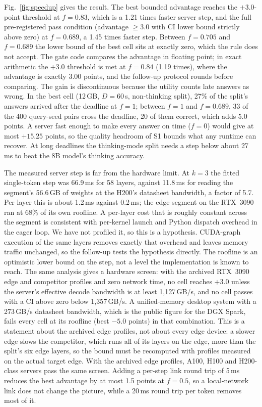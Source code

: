 \documentclass[lettersize,journal]{IEEEtran}
\begin{document}
Fig.~\ref{fig:speedup} gives the result. The best bounded advantage reaches the $+3.0$-point threshold at $f=0.83$, which is a 1.21 times faster server step, and the full pre-registered pass condition (advantage $\geq3.0$ with CI lower bound strictly above zero) at $f=0.689$, a 1.45 times faster step. Between $f=0.705$ and $f=0.689$ the lower bound of the best cell sits at exactly zero, which the rule does not accept. The gate code compares the advantage in floating point; in exact arithmetic the $+3.0$ threshold is met at $f=0.84$ (1.19 times), where the advantage is exactly 3.00 points, and the follow-up protocol rounds before comparing. The gain is discontinuous because the utility counts late answers as wrong. In the best cell (12\,GB, $D=60$\,s, non-thinking split), 27\% of the split's answers arrived after the deadline at $f=1$; between $f=1$ and $f=0.689$, 33 of the 400 query-seed pairs cross the deadline, 20 of them correct, which adds 5.0 points. A server fast enough to make every answer on time ($f=0$) would give at most $+15.25$ points, so the quality headroom of S1 bounds what any runtime can recover. At long deadlines the thinking-mode split needs a step below about 27\,ms to beat the 8B model's thinking accuracy.

The measured server step is far from the hardware limit. At $k=3$ the fitted single-token step was 66.9\,ms for 58 layers, against 11.8\,ms for reading the segment's 56.6\,GB of weights at the H200's datasheet bandwidth, a factor of 5.7. Per layer this is about 1.2\,ms against 0.2\,ms; the edge segment on the RTX~3090 ran at 68\% of its own roofline. A per-layer cost that is roughly constant across the segment is consistent with per-kernel launch and Python dispatch overhead in the eager loop. We have not profiled it, so this is a hypothesis. CUDA-graph execution of the same layers removes exactly that overhead and leaves memory traffic unchanged, so the follow-up tests the hypothesis directly. The roofline is an optimistic lower bound on the step, not a level the implementation is known to reach. The same analysis gives a hardware screen: with the archived RTX~3090 edge and competitor profiles and zero network time, no cell reaches $+3.0$ unless the server's effective decode bandwidth is at least 1,127\,GB/s, and no cell passes with a CI above zero below 1,357\,GB/s. A unified-memory desktop system with a 273\,GB/s datasheet bandwidth, which is the public figure for the DGX Spark, fails every cell at its roofline (best $-5.0$ points) in that combination. This is a statement about the archived edge profiles, not about every edge device: a slower edge slows the competitor, which runs all of its layers on the edge, more than the split's six edge layers, so the bound must be recomputed with profiles measured on the actual target edge. With the archived edge profiles, A100, H100 and H200-class servers pass the same screen. Adding a per-step link round trip of 5\,ms reduces the best advantage by at most 1.5 points at $f=0.5$, so a local-network link does not change the picture, while a 20\,ms round trip per token removes most of it.
\end{document}
